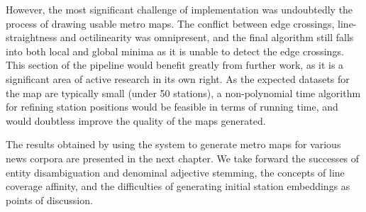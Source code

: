 However, the most significant challenge of implementation was undoubtedly the process of drawing usable metro maps. The conflict between edge crossings, line-straightness and octilinearity was omnipresent, and the final algorithm still falls into both local and global minima as it is unable to detect the edge crossings. This section of the pipeline would benefit greatly from further work, as it is a significant area of active research in its own right. As the expected datasets for the map are typically small (under 50 stations),  a non-polynomial time algorithm for refining station positions would be feasible in terms of running time, and would doubtless improve the quality of the maps generated.

The results obtained by using the system to generate metro maps for various news corpora are presented in the next chapter. We take forward the successes of entity disambiguation and denominal adjective stemming, the concepts of line coverage affinity, and the difficulties of generating initial station embeddings as points of discussion.

